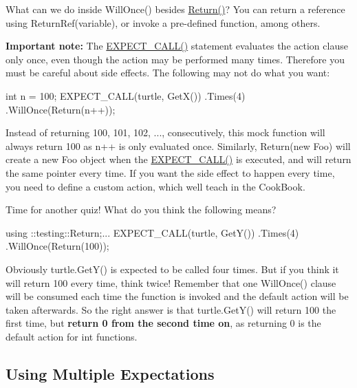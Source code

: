 What can we do inside {\ttfamily Will\+Once()} besides {\ttfamily \hyperlink{namespacetesting_af6d1c13e9376c77671e37545cd84359c}{Return()}}? You can return a reference using {\ttfamily Return\+Ref(variable)}, or invoke a pre-\/defined function, among others.

{\bfseries Important note\+:} The {\ttfamily \hyperlink{gmock-spec-builders_8h_a535a6156de72c1a2e25a127e38ee5232}{E\+X\+P\+E\+C\+T\+\_\+\+C\+A\+L\+L()}} statement evaluates the action clause only once, even though the action may be performed many times. Therefore you must be careful about side effects. The following may not do what you want\+:


\begin{DoxyCode}
int n = 100;
EXPECT\_CALL(turtle, GetX())
.Times(4)
.WillOnce(Return(n++));
\end{DoxyCode}


Instead of returning 100, 101, 102, ..., consecutively, this mock function will always return 100 as {\ttfamily n++} is only evaluated once. Similarly, {\ttfamily Return(new Foo)} will create a new {\ttfamily Foo} object when the {\ttfamily \hyperlink{gmock-spec-builders_8h_a535a6156de72c1a2e25a127e38ee5232}{E\+X\+P\+E\+C\+T\+\_\+\+C\+A\+L\+L()}} is executed, and will return the same pointer every time. If you want the side effect to happen every time, you need to define a custom action, which we\textquotesingle{}ll teach in the Cook\+Book.

Time for another quiz! What do you think the following means?


\begin{DoxyCode}
using ::testing::Return;...
EXPECT\_CALL(turtle, GetY())
.Times(4)
.WillOnce(Return(100));
\end{DoxyCode}


Obviously {\ttfamily turtle.\+Get\+Y()} is expected to be called four times. But if you think it will return 100 every time, think twice! Remember that one {\ttfamily Will\+Once()} clause will be consumed each time the function is invoked and the default action will be taken afterwards. So the right answer is that {\ttfamily turtle.\+Get\+Y()} will return 100 the first time, but {\bfseries return 0 from the second time on}, as returning 0 is the default action for {\ttfamily int} functions.

\subsection*{Using Multiple Expectations}

